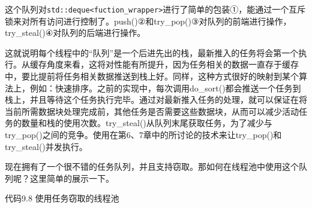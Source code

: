 这个队列对\texttt{std::deque<fuction\_wrapper>}进行了简单的包装①，能通过一个互斥锁来对所有访问进行控制了。push()②和try\_pop()③对队列的前端进行操作，try\_steal()④对队列的后端进行操作。

这就说明每个线程中的“队列”是一个后进先出的栈，最新推入的任务将会第一个执行。从缓存角度来看，这将对性能有所提升，因为任务相关的数据一直存于缓存中，要比提前将任务相关数据推送到栈上好。同样，这种方式很好的映射到某个算法上，例如：快速排序。之前的实现中，每次调用do\_sort()都会推送一个任务到栈上，并且等待这个任务执行完毕。通过对最新推入任务的处理，就可以保证在将当前所需数据块处理完成前，其他任务是否需要这些数据块，从而可以减少活动任务的数量和栈的使用次数。try\_steal()从队列末尾获取任务，为了减少与try\_pop()之间的竞争。使用在第6、7章中的所讨论的技术来让try\_pop()和try\_steal()并发执行。

现在拥有了一个很不错的任务队列，并且支持窃取。那如何在线程池中使用这个队列呢？这里简单的展示一下。

代码9.8 使用任务窃取的线程池

